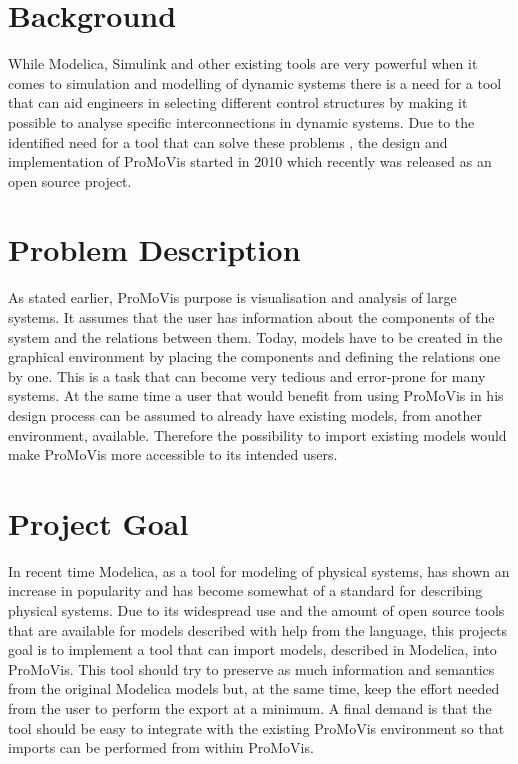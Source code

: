 \section{Background}
While Modelica, Simulink and other existing tools are very powerful when it comes to simulation and modelling of  dynamic systems there is a need for a tool that can aid engineers in selecting different control structures by making it possible to analyse specific interconnections in dynamic systems. %
Due to the identified need for a tool that can solve these problems \cite{ProMoVisPaper}\nocite{*}, the design and implementation of ProMoVis started in 2010 which recently was released as an open source project.
\section{Problem Description}
As stated earlier, ProMoVis purpose is visualisation and analysis of large systems. It assumes that the user has information about the components of the system and the relations between them.  Today, %
models have to be created in the graphical environment by placing the components and defining the relations one by one. This is a task that can become very tedious and error-prone for many systems. At the same time a user that would benefit from using ProMoVis in his design process can be assumed to already have existing models, from another environment, available. Therefore the possibility to import existing models would make ProMoVis more accessible to its intended users.
\section{Project Goal}
In recent time Modelica, as a tool for modeling of physical systems, has shown an increase in popularity and has become somewhat of a standard for describing physical systems. Due to its widespread use and the amount of open source tools that are available for models described with help from the language, this projects goal is to implement a tool that can import models, described in Modelica, into ProMoVis. This tool should try to preserve as much information and semantics from the original Modelica models but, at the same time, keep the effort needed from the user to perform the export at a minimum. A final demand is that the tool should be easy to integrate with the existing ProMoVis environment so that imports can be performed from within ProMoVis.



